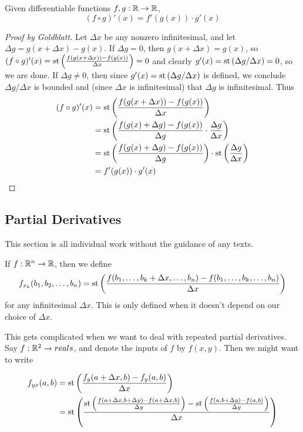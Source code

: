 \begin{thm}\label{ChainRule}
    Given differentiable functions $f, g: \mathbb{R} \to \mathbb{R}$, 
    \[(f \circ g)'(x) = f'(g(x)) \cdot g'(x)\]
\end{thm}

\begin{proof}[Proof by Goldblatt]
    Let $\Delta x$ be any nonzero infinitesimal, and let $\Delta g = g(x + \Delta x) - g(x)$. If $\Delta g = 0$, then $g(x + \Delta x) = g(x)$, so $(f \circ g)'(x) = \operatorname{st}\left(\frac{f(g(x + \Delta x)) - f(g(x))}{\Delta x}\right) = 0$ and clearly $g'(x) = \operatorname{st}\left(\Delta g / \Delta x\right) = 0$, so we are done. If $\Delta g \neq 0$, then since $g'(x) = \operatorname{st}\left(\Delta g / \Delta x\right)$ is defined, we conclude $\Delta g / \Delta x$ is bounded and (since $\Delta x$ is infinitesimal) that $\Delta g$ is infinitesimal. Thus
\begin{align*}
    (f \circ g)'(x) &= \operatorname{st}\left(\frac{f(g(x + \Delta x)) - f(g(x))}{\Delta x}\right) \\
        &= \operatorname{st}\left(\frac{f(g(x) + \Delta g) - f(g(x))}{\Delta g} \cdot \frac{\Delta g}{\Delta x}\right) \\
        &= \operatorname{st}\left(\frac{f(g(x) + \Delta g) - f(g(x))}{\Delta g}\right) \cdot \operatorname{st}\left(\frac{\Delta g}{\Delta x}\right) \\
        &= f'(g(x)) \cdot g'(x)
\end{align*}
\end{proof}

\subsection{Partial Derivatives}
This section is all individual work without the guidance of any texts.

\begin{defn}
    If $f: \mathbb{R}^n \to \mathbb{R}$, then we define
    \[f_{x_k}(b_1, b_2, \ldots, b_n) = \operatorname{st}\left(\frac{f(b_1, \ldots, b_k + \Delta x, \ldots, b_n) - f(b_1, \ldots, b_k, \ldots, b_n)}{\Delta x}\right) \]
    for any infinitesimal $\Delta x$. This is only defined when it doesn't depend on our choice of $\Delta x$.
\end{defn}

This gets complicated when we want to deal with repeated partial derivatives. Say $f: \mathbb{R}^2 \to reals$, and denote the inputs of $f$ by $f(x, y)$. Then we might want to write

\begin{align*}
    f_{yx}(a, b) &= \operatorname{st}\left(\frac{f_y(a + \Delta x, b) - f_y(a, b)}{\Delta x}\right) \\
        &= \operatorname{st}\left(\frac{\operatorname{st}\left(\frac{f(a + \Delta x, b + \Delta y) - f(a + \Delta x, b)}{\Delta y}\right) - \operatorname{st}\left(\frac{f(a, b + \Delta y) - f(a, b)}{\Delta y}\right)}{\Delta x}\right)
\end{align*}

